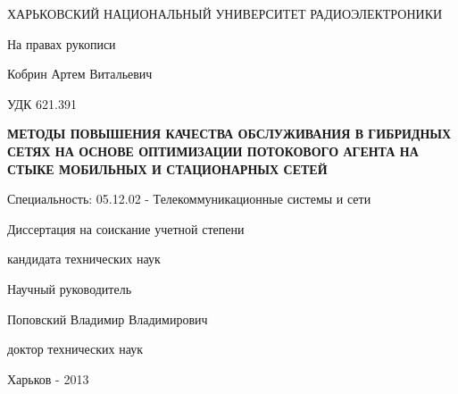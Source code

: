 \begin{titlepage}

 ХАРЬКОВСКИЙ НАЦИОНАЛЬНЫЙ УНИВЕРСИТЕТ РАДИОЭЛЕКТРОНИКИ

 \vspace*{3.5em plus .6em minus .5em}
\begin{flushright}
 На правах рукописи
\end{flushright}

 \vspace*{3.5em plus .6em minus .5em}
Кобрин Артем Витальевич

 \vspace*{1.5em plus .6em minus .5em}
\begin{flushright}
 УДК 621.391
\end{flushright}

 \vspace*{1.5em plus .6em minus .5em}
\MakeUppercase{\textbf{Методы повышения качества обслуживания в гибридных сетях на основе оптимизации 
потокового агента на стыке мобильных и стационарных сетей}}

 \vspace*{3.5em plus .6em minus .5em}
Специальность: 05.12.02 - Телекоммуникационные системы и сети
 \vspace*{3.5em plus .6em minus .5em}
 
 Диссертация на соискание учетной степени 
 
 кандидата технических наук

  \vspace*{4em plus .6em minus .5em}
\begin{flushleft}

\hangindent=8cm  \noindent
 Научный руководитель

 Поповский Владимир Владимирович

 доктор технических наук

\end{flushleft}

 
  \vspace*{4em plus .6em minus .5em}
 Харьков - 2013
 
\end{titlepage}
